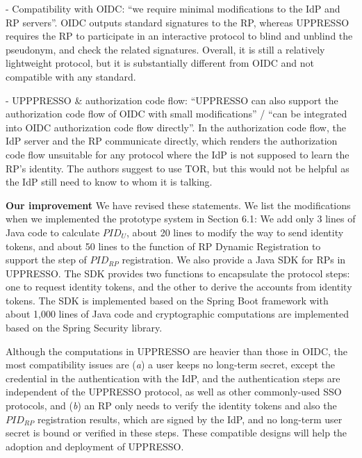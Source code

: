 \documentclass[letterpaper,onecolumn,10pt]{article}
\begin{document}
\noindent - Compatibility with OIDC: ``we require minimal modifications to the IdP and RP servers''.
OIDC outputs standard signatures to the RP, whereas UPPRESSO requires the RP to participate in an interactive protocol to blind and unblind the pseudonym, and check the related signatures. Overall, it is still a relatively lightweight protocol, but it is substantially different from OIDC and not compatible with any standard.

\noindent - UPPPRESSO \& authorization code flow: ``UPPRESSO can also support the authorization code flow of OIDC with small modifications'' / ``can be integrated into OIDC authorization code flow directly''.
In the authorization code flow, the IdP server and the RP communicate directly, which renders the authorization code flow unsuitable for any protocol where the IdP is not supposed to learn the RP's identity. The authors suggest to use TOR, but this would not be helpful as the IdP still need to know to whom it is talking.


\vspace{1mm}\noindent\textbf{Our improvement}
We have revised these statements. We list the modifications when we implemented the prototype system in Section 6.1:
We add only 3 lines of Java code to calculate $PID_U$, about 20 lines to modify the way to send identity tokens,
 and about 50 lines to the function of RP Dynamic Registration to support the step of $PID_{RP}$ registration.
We also provide a Java SDK for RPs in UPPRESSO.
The SDK provides two functions to encapsulate the protocol steps:
one to request identity tokens, and the other to derive the accounts from identity tokens.
 The SDK is implemented based on the Spring Boot framework with about 1,000 lines of Java code
  and cryptographic computations are implemented based on the Spring Security library.

Although the computations in UPPRESSO are heavier than those in OIDC,
    the most compatibility issues are (\emph{a}) a user keeps no long-term secret, except the credential in the authentication with the IdP,
        and the authentication steps are independent of the UPPRESSO protocol, as well as other commonly-used SSO protocols,
        and (\emph{b}) an RP only needs to verify the identity tokens and also the $PID_{RP}$ registration results, which are signed by the IdP,
                and no long-term user secret is bound or verified in these steps.
These compatible designs will help the adoption and deployment of UPPRESSO.
\end{document}
